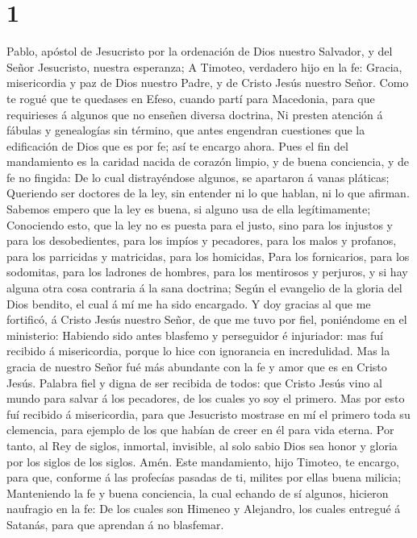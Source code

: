 \hypertarget{section}{%
\section{1}\label{section}}

 Pablo, apóstol de Jesucristo por la ordenación de Dios
nuestro Salvador, y del Señor Jesucristo, nuestra esperanza;
 A Timoteo, verdadero hijo en la fe: Gracia, misericordia y
paz de Dios nuestro Padre, y de Cristo Jesús nuestro Señor. 
Como te rogué que te quedases en Efeso, cuando partí para Macedonia,
para que requirieses á algunos que no enseñen diversa doctrina,
 Ni presten atención á fábulas y genealogías sin término,
que antes engendran cuestiones que la edificación de Dios que es por fe;
así te encargo ahora.  Pues el fin del mandamiento es la
caridad nacida de corazón limpio, y de buena conciencia, y de fe no
fingida:  De lo cual distrayéndose algunos, se apartaron á
vanas pláticas;  Queriendo ser doctores de la ley, sin
entender ni lo que hablan, ni lo que afirman.  Sabemos
empero que la ley es buena, si alguno usa de ella legítimamente;
 Conociendo esto, que la ley no es puesta para el justo,
sino para los injustos y para los desobedientes, para los impíos y
pecadores, para los malos y profanos, para los parricidas y matricidas,
para los homicidas,  Para los fornicarios, para los
sodomitas, para los ladrones de hombres, para los mentirosos y perjuros,
y si hay alguna otra cosa contraria á la sana doctrina; 
Según el evangelio de la gloria del Dios bendito, el cual á mí me ha
sido encargado.  Y doy gracias al que me fortificó, á
Cristo Jesús nuestro Señor, de que me tuvo por fiel, poniéndome en el
ministerio:  Habiendo sido antes blasfemo y perseguidor é
injuriador: mas fuí recibido á misericordia, porque lo hice con
ignorancia en incredulidad.  Mas la gracia de nuestro Señor
fué más abundante con la fe y amor que es en Cristo Jesús. 
Palabra fiel y digna de ser recibida de todos: que Cristo Jesús vino al
mundo para salvar á los pecadores, de los cuales yo soy el primero.
 Mas por esto fuí recibido á misericordia, para que
Jesucristo mostrase en mí el primero toda su clemencia, para ejemplo de
los que habían de creer en él para vida eterna.  Por tanto,
al Rey de siglos, inmortal, invisible, al solo sabio Dios sea honor y
gloria por los siglos de los siglos. Amén.  Este
mandamiento, hijo Timoteo, te encargo, para que, conforme á las
profecías pasadas de ti, milites por ellas buena milicia; 
Manteniendo la fe y buena conciencia, la cual echando de sí algunos,
hicieron naufragio en la fe:  De los cuales son Himeneo y
Alejandro, los cuales entregué á Satanás, para que aprendan á no
blasfemar.

